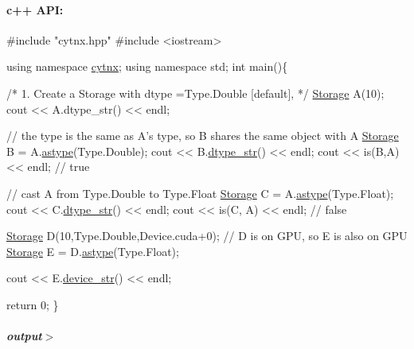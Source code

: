 \paragraph*{c++ A\+PI\+:}


\begin{DoxyCodeInclude}
\textcolor{preprocessor}{#include "cytnx.hpp"}
\textcolor{preprocessor}{#include <iostream>}


\textcolor{keyword}{using namespace }\hyperlink{namespacecytnx}{cytnx};
\textcolor{keyword}{using namespace }std;
\textcolor{keywordtype}{int} main()\{ 

    \textcolor{comment}{/*}
\textcolor{comment}{        1. Create a Storage with }
\textcolor{comment}{        dtype =Type.Double [default],}
\textcolor{comment}{    */}
    \hyperlink{classcytnx_1_1Storage}{Storage} A(10);
    cout << A.dtype\_str() << endl;

    \textcolor{comment}{// the type is the same as A's type, so B shares the same object with A}
    \hyperlink{classcytnx_1_1Storage}{Storage} B = A.\hyperlink{classcytnx_1_1Storage_a8310d8dbb70510272ded2e3d01be25f0}{astype}(Type.Double); 
    cout << B.\hyperlink{classcytnx_1_1Storage_ab6e9fb01ad4655701a2d54dc978eef17}{dtype\_str}() << endl;
    cout << is(B,A) << endl; \textcolor{comment}{// true}

    \textcolor{comment}{// cast A from Type.Double to Type.Float}
    \hyperlink{classcytnx_1_1Storage}{Storage} C = A.\hyperlink{classcytnx_1_1Storage_a8310d8dbb70510272ded2e3d01be25f0}{astype}(Type.Float);
    cout << C.\hyperlink{classcytnx_1_1Storage_ab6e9fb01ad4655701a2d54dc978eef17}{dtype\_str}() << endl;
    cout << is(C, A) << endl; \textcolor{comment}{// false}


    \hyperlink{classcytnx_1_1Storage}{Storage} D(10,Type.Double,Device.cuda+0);
    \textcolor{comment}{// D is on GPU, so E is also on GPU}
    \hyperlink{classcytnx_1_1Storage}{Storage} E = D.\hyperlink{classcytnx_1_1Storage_a8310d8dbb70510272ded2e3d01be25f0}{astype}(Type.Float);

    cout << E.\hyperlink{classcytnx_1_1Storage_ae0d90d5275fa7e52a0a2dc10512ba71f}{device\_str}() << endl; 

 

    \textcolor{keywordflow}{return} 0;
\}

\end{DoxyCodeInclude}
 \subparagraph*{output$>$}


\begin{DoxyVerbInclude}
\end{DoxyVerbInclude}
